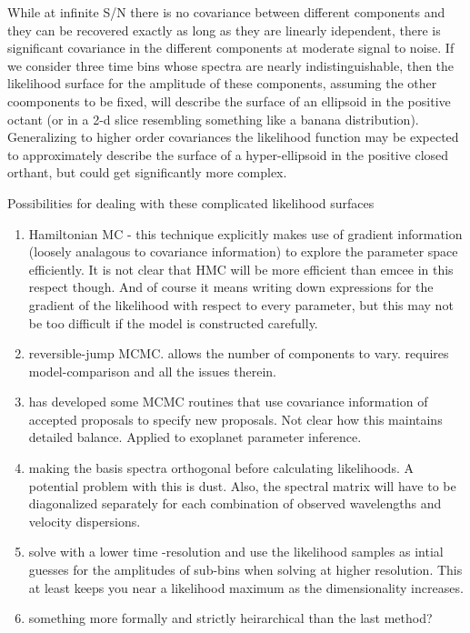 \documentclass{emulateapj}
\begin{document}
While at infinite S/N there is no covariance between different components and they can be recovered exactly as long as they are linearly idependent, there is significant covariance in the different components at moderate signal to noise.  If we consider three time bins whose spectra are nearly indistinguishable, then the likelihood surface for the amplitude of these components, assuming the other coomponents to be fixed, will describe the surface of an ellipsoid in the positive octant (or in a 2-d slice resembling something like a banana distribution).  Generalizing to higher order covariances the likelihood function may be expected to approximately describe the surface of a hyper-ellipsoid in the positive closed orthant, but could get significantly more complex.

Possibilities for dealing with these complicated likelihood surfaces 
\begin{enumerate}

\item Hamiltonian MC - this technique explicitly makes use of gradient information (loosely analagous to covariance information) to explore the parameter space efficiently.  It is not clear that HMC will be more efficient than emcee in this respect though.  And of course it means writing down expressions for the gradient of the likelihood with respect to every parameter, but this may not be too difficult if the model is constructed carefully.

\item reversible-jump MCMC.  allows the number of components to vary.  requires model-comparison and all the issues therein.  

\item \citet{gregory11} has developed some MCMC routines that use covariance information of accepted proposals to specify new proposals.  Not clear how this maintains detailed balance.  Applied to exoplanet parameter inference.

\item making the basis spectra orthogonal before calculating likelihoods.  A potential problem with this is dust.  Also, the spectral matrix will have to be diagonalized separately for each combination of observed wavelengths and velocity dispersions.

\item solve with a lower time -resolution and use the likelihood samples as intial guesses for the amplitudes of sub-bins when solving at higher resolution.  This at least keeps you near a likelihood maximum as the dimensionality increases.

\item something more formally and strictly heirarchical than the last method?

\end{enumerate}
\end{document}
